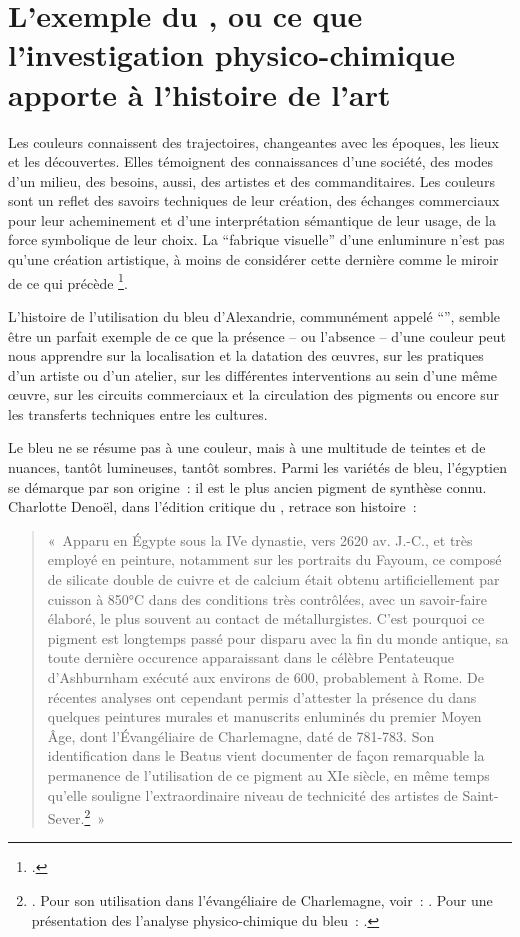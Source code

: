 \section{L’exemple du , ou ce que l’investigation physico-chimique apporte à l’histoire de l’art}

Les couleurs connaissent des trajectoires, changeantes avec les époques, les lieux et les découvertes. Elles témoignent des connaissances d'une société, des modes d'un milieu, des besoins, aussi, des artistes et des commanditaires. Les couleurs sont un reflet des savoirs techniques de leur création, des échanges commerciaux pour leur acheminement et d’une interprétation sémantique de leur usage, de la force symbolique de leur choix. La \enquote{fabrique visuelle} d’une enluminure n'est pas qu'une création artistique, à moins de considérer cette dernière comme le miroir de ce qui précède \footcite[Pour une introduction à la trajectoire des couleurs travers le temps, voir][]{pastoureau_petit_2014}.\par
L’histoire de l'utilisation du bleu d’Alexandrie, communément appelé \enquote{}, semble être un parfait exemple de ce que la présence – ou l'absence – d'une couleur peut nous apprendre sur la localisation et la datation des œuvres, sur les pratiques d’un artiste ou d’un atelier, sur les différentes interventions au sein d’une même œuvre, sur les circuits commerciaux et la circulation des pigments ou encore sur les transferts techniques entre les cultures.\par
Le bleu ne se résume pas à une couleur, mais à une multitude de teintes et de nuances, tantôt lumineuses, tantôt sombres. Parmi les variétés de bleu, l’égyptien se démarque par son origine : il est le plus ancien pigment de synthèse connu. Charlotte Denoël, dans l’édition critique du \textit{}, retrace son histoire~:\par
\begin{quote}
« Apparu en Égypte sous la IVe dynastie, vers 2620 av. J.-C., et très employé en peinture, notamment sur les portraits du Fayoum, ce composé de silicate double de cuivre et de calcium était obtenu artificiellement par cuisson à 850°C dans des conditions très contrôlées, avec un savoir-faire élaboré, le plus souvent au contact de métallurgistes. C’est pourquoi ce pigment est longtemps passé pour disparu avec la fin du monde antique, sa toute dernière occurence apparaissant dans le célèbre Pentateuque d’Ashburnham exécuté aux environs de 600, probablement à Rome. De récentes analyses ont cependant permis d’attester la présence du  dans quelques peintures murales et manuscrits enluminés du premier Moyen Âge, dont l’Évangéliaire de Charlemagne, daté de 781-783. Son identification dans le Beatus vient documenter de façon remarquable la permanence de l’utilisation de ce pigment au XIe siècle, en même temps qu’elle souligne l’extraordinaire niveau de technicité des artistes de Saint-Sever.\footnote{\cite{denoel_beatus_2022}. Pour son utilisation dans l’évangéliaire de Charlemagne, voir~: \cite{roger_etude_2007}. Pour une présentation des l’analyse physico-chimique du bleu : \cite{gameson_pigments_2023}.} » 
\end{quote} \par
